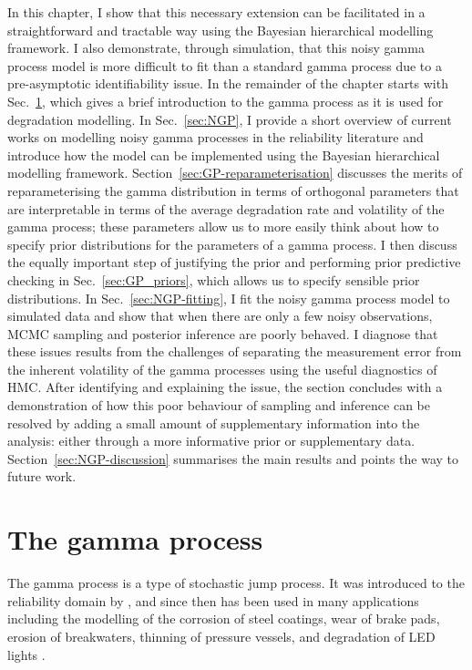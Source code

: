 In this chapter, I show that this necessary extension can be facilitated in a straightforward and tractable way using the Bayesian hierarchical modelling framework. I also demonstrate, through simulation, that this noisy gamma process model is more difficult to fit than a standard gamma process due to a pre-asymptotic identifiability issue. In the remainder of the chapter starts with Sec.~\ref{sec:GP}, which gives a brief introduction to the gamma process as it is used for degradation modelling. In Sec.~\ref{sec:NGP}, I provide a short overview of current works on modelling noisy gamma processes in the reliability literature and introduce how the model can be implemented using the Bayesian hierarchical modelling framework. Section~\ref{sec:GP-reparameterisation} discusses the merits of reparameterising the gamma distribution in terms of orthogonal parameters that are interpretable in terms of the average degradation rate and volatility of the gamma process; these parameters allow us to more easily think about how to specify prior distributions for the parameters of a gamma process. I then discuss the equally important step of justifying the prior and performing prior predictive checking in Sec.~\ref{sec:GP_priors}, which allows us to specify sensible prior distributions. In Sec.~\ref{sec:NGP-fitting}, I fit the noisy gamma process model to simulated data and show that when there are only a few noisy observations, MCMC sampling and posterior inference are poorly behaved. I diagnose that these issues results from the challenges of separating the measurement error from the inherent volatility of the gamma processes using the useful diagnostics of HMC. After identifying and explaining the issue, the section concludes with a demonstration of how this poor behaviour of sampling and inference can be resolved by adding a small amount of supplementary information into the analysis: either through a more informative prior or supplementary data. Section~\ref{sec:NGP-discussion} summarises the main results and points the way to future work.

\section{The gamma process} \label{sec:GP}

The gamma process is a type of stochastic jump process. It was introduced to the reliability domain by \citet{abdel-hameed1975}, and since then has been used in many applications including the modelling of the corrosion of steel coatings, wear of brake pads, erosion of breakwaters, thinning of pressure vessels, and degradation of LED lights \citep{van_noortwijk2009}. 

